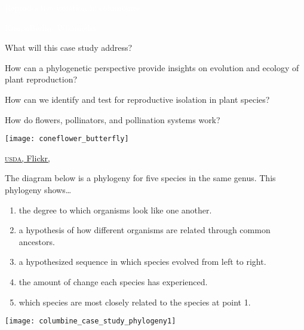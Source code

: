 \documentclass[t,hidelinks]{beamer}
\newcommand{\ques}[1]{\highlight{\textsc{q#1:}}}
\begin{document}
{
\begin{frame}[t]{\textcolor{white}{Reproductive isolation in columbines.}}

\vfilll

\tiny \textcolor{white}{KimonBerlin, Wikimedia }
\end{frame}
}
%
\begin{frame}[t]{What will this case study address?}

	\begin{multicols}{2}
	\hangpara How can a phylogenetic perspective provide insights on evolution and ecology of plant reproduction?
	
	\hangpara How can we identify and test for reproductive isolation in plant species?

	\hangpara How do flowers, pollinators, and pollination systems work?

	\columnbreak
	
	\texttt{[image: coneflower\_butterfly]}
	\end{multicols}
	 
	\vfilll
	
	\hfill \tiny \href{https://www.flickr.com/photos/usdagov/12837726385/in/photolist-kyqGN6-fh8AaV-kyTDd4-i44Hma-dMyexJ-U9oNPh-8MVKpC-9iEtgR-pfUkfN-i6BB1D-WeaPsw-aqUmTV-6R2QfY-e1GG39-JdQ1fs-YNbHzz-9gp9eM-att94W-wqBjH2-ePxjLW-kyWRcE-Ydheej-8MSKyg-bfTrkF-9gsens-8FgBqc-WBMVv8-XR5juK-Kcompi-FoKX42-8Pk8CA-RLnLix-XK1ySw-pxAjzB-okRa8S-WTUtFQ-f8KyKZ-pqdijo-pbz8dh-8FjQDY-8MVKru-cEHMp7-eY8rmA-JcEdDd-f9epwz-8FgBtV-br2Mtc-WmM4uM-e5Cc3s-WeaQP9}{\textsc{usda}, Flickr, }
\end{frame}
%
\begin{frame}[t]{\ques1 The diagram below is a phylogeny for five species in the same genus. This phylogeny shows\dots}
		

	\begin{multicols}{2}
	\begin{enumerate}
		\item the degree to which organisms look like one another.
		
		\item \alert<2>{a hypothesis of how different organisms are related through common ancestors.}

		\item a hypothesized sequence in which species evolved from left to right.

		\item the amount of change each species has experienced.

		\item which species are most closely related to the species at point 1. 

	\end{enumerate}
	
	\columnbreak

		\hfill \texttt{[image: columbine\_case\_study\_phylogeny1]}
\end{multicols}
\end{frame}
\end{document}

